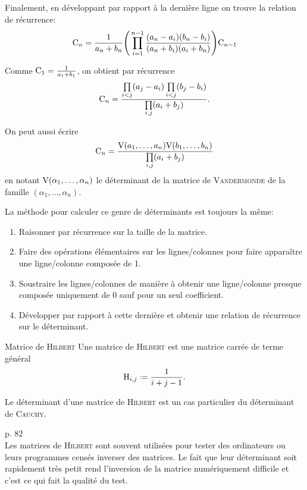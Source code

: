 \begin{preuve}
    Finalement, en développant par rapport à la dernière ligne on trouve la relation de récurrence:
    $$\mathrm{C}_n =  \frac{1}{a_n + b_n} \Bigg( \prod\limits_{i = 1}^{n-1}\frac{(a_n - a_i)(b_n - b_i)}{(a_n + b_i)(a_i + b_n)} \Bigg) \mathrm{C}_{n-1}$$
    
    Comme $\mathrm{C}_1 = \frac{1}{a_1+b_1}$, on obtient par récurrence
    $$\mathrm{C}_n = \frac{\prod\limits_{i<j}(a_j-a_i) \prod\limits_{i<j}(b_j-b_i)}{\prod\limits_{i,j}(a_i+b_j)}.$$
\end{preuve}

\begin{remarque}
    On peut aussi écrire
    $$\mathrm{C}_n = \frac{\mathrm{V}(a_1, \dots, a_n) \mathrm{V}(b_1, \dots, b_n)}{\prod\limits_{i,j}(a_i+b_j)}$$
    en notant $\mathrm{V}(\alpha_1, \dots, \alpha_n)$ le déterminant de la matrice de \textsc{Vandermonde} de la famille $(\alpha_1, \dots, \alpha_n)$.
\end{remarque}

\begin{methode}
    La méthode pour calculer ce genre de déterminants  est toujours la même: 
    \begin{enumerate}
        \item Raisonner par récurrence sur la taille de la matrice.
        \item Faire des opérations élémentaires sur les lignes/colonnes pour faire apparaître une ligne/colonne composée de 1. 
        \item Soustraire les lignes/colonnes de manière à obtenir une ligne/colonne presque composée uniquement de 0 sauf pour un seul coefficient. 
        \item Développer par rapport à cette dernière et obtenir une relation de récurrence sur le déterminant. 
    \end{enumerate}
\end{methode}

\begin{box_titre}{Matrice de \textsc{Hilbert}} \label{matrice_hilbert}
    Une matrice de \textsc{Hilbert} est une matrice carrée de terme général
    $$\Hilb_{i,j} \defeq {\frac {1}{i+j-1}}.$$
\end{box_titre}

\begin{remarque}
    Le déterminant d'une matrice de \textsc{Hilbert} est un cas particulier du déterminant de \textsc{Cauchy}.
\end{remarque}

\begin{remarque}
    \cite{exos_oraux} p. 82 \\
    Les matrices de \textsc{Hilbert} sont souvent utilisées pour tester des ordinateurs ou leurs programmes censés inverser des matrices. Le fait que leur déterminant soit rapidement très petit rend l'inversion de la matrice numériquement difficile et c'est ce qui fait la qualité du test. 
\end{remarque}
